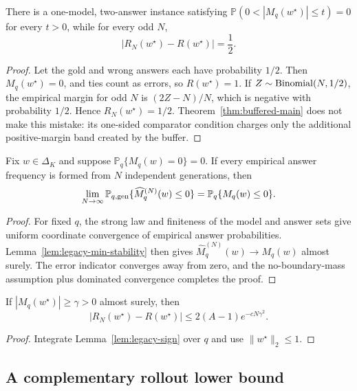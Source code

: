 \begin{proposition}
\label{prop:legacy-zero-atom}
There is a one-model, two-answer instance satisfying
\(\mathbb P(0<|M_q(w^\star)|\le t)=0\) for every \(t>0\), while for every odd
\(N\),
\[
|R_N(w^\star)-R(w^\star)|=\frac12.
\]
\end{proposition}

\begin{proof}
Let the gold and wrong answers each have probability \(1/2\).  Then
\(M_q(w^\star)=0\), and ties count as errors, so \(R(w^\star)=1\).  If
\(Z\sim{\rm Binomial}(N,1/2)\), the empirical margin for odd \(N\) is
\((2Z-N)/N\), which is negative with probability \(1/2\).  Hence
\(R_N(w^\star)=1/2\).  Theorem~\ref{thm:buffered-main} does not make this
mistake: its one-sided comparator condition charges only the additional
positive-margin band created by the buffer.
\end{proof}

\begin{theorem}
\label{thm:legacy-exact-limit}
Fix \(w\in\Delta_K\) and suppose
\(\mathbb P_q\{M_q(w)=0\}=0\).  If every empirical answer frequency is formed
from \(N\) independent generations, then
\[
\lim_{N\to\infty}
\mathbb P_{q,\rm gen}\{\widehat M_q^{(N)}(w)\le0\}
=
\mathbb P_q\{M_q(w)\le0\}.
\]
\end{theorem}

\begin{proof}
For fixed \(q\), the strong law and finiteness of the model and answer sets
give uniform coordinate convergence of empirical answer probabilities.
Lemma~\ref{lem:legacy-min-stability} then gives
\(\widehat M_q^{(N)}(w)\to M_q(w)\) almost surely.  The error indicator
converges away from zero, and the no-boundary-mass assumption plus dominated
convergence completes the proof.
\end{proof}

\begin{corollary}
\label{cor:legacy-separated}
If \(|M_q(w^\star)|\ge\gamma>0\) almost surely, then
\[
|R_N(w^\star)-R(w^\star)|
\le 2(A-1)e^{-cN\gamma^2}.
\]
\end{corollary}

\begin{proof}
Integrate Lemma~\ref{lem:legacy-sign} over \(q\) and use
\(\|w^\star\|_2\le1\).
\end{proof}

\subsection{A complementary rollout lower bound}
\label{app:legacy-lower-bound}

